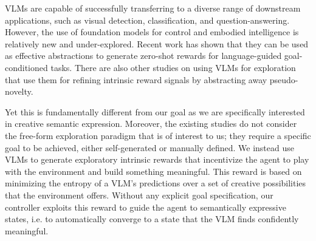 VLMs are capable of successfully transferring to a diverse range of downstream applications, such as visual detection, classification, and question-answering.
However, the use of foundation models for control and embodied intelligence is relatively new and under-explored.
% 
% 
Recent work \citep{zest,negprompt,vlmrm,lamp} has shown that they can be used as effective abstractions to generate zero-shot rewards for language-guided goal-conditioned tasks.
There are also other studies on using VLMs for exploration \citep{vlmlang,vlmdistill} that use them for refining intrinsic reward signals by abstracting away pseudo-novelty. 

Yet this is fundamentally different from our goal as we are specifically interested in creative semantic expression.
Moreover, the existing studies do not consider the free-form exploration paradigm that is of interest to us; they require a specific goal to be achieved, either self-generated or manually defined.
We instead use VLMs to generate exploratory intrinsic rewards that incentivize the agent to play with the environment and build something meaningful.
This reward is based on minimizing the entropy of a VLM's predictions over a set of creative possibilities that the environment offers.
Without any explicit goal specification, our controller exploits this reward to guide the agent to semantically expressive states, i.e. to automatically converge to a state that the VLM finds confidently meaningful.

